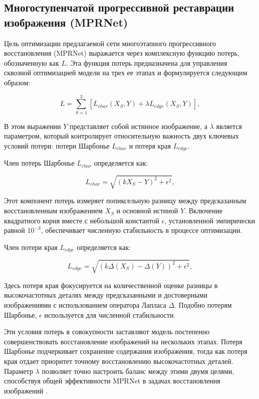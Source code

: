 \subsection{Многоступенчатой прогрессивной реставрации изображения (MPRNet)}

Цель оптимизации предлагаемой сети многоэтапного прогрессивного восстановления (MPRNet) выражается через комплексную функцию потерь, обозначенную как \(L \). Эта функция потерь предназначена для управления сквозной оптимизацией модели на трех ее этапах и формулируется следующим образом:

\begin{equation}
	L = \sum_{S=1}^{3} [L_{char}(X_S, Y) + \lambda L_{edge}(X_S, Y)],
\end{equation}

В этом выражении \( Y \) представляет собой истинное изображение, а \( \lambda \) является параметром, который контролирует относительную важность двух ключевых условий потери: потери Шарбонье \( L_{char} \) и потеря края \( L_{edge} \).

Член потерь Шарбонье \( L_{char} \) определяется как:

\begin{equation}
	L_{char} = \sqrt{(kX_S - Y)^2 + \epsilon^2},
\end{equation}

Этот компонент потерь измеряет попиксельную разницу между предсказанным восстановленным изображением \( X_S \) и основной истиной \( Y \). Включение квадратного корня вместе с небольшой константой \( \epsilon \), установленной эмпирически равной \( 10^{-3} \), обеспечивает численную стабильность в процессе оптимизации.

Член потери края \( L_{edge} \) определяется как:

\begin{equation}
	L_{edge} = \sqrt{(k\Delta(X_S) - \Delta(Y))^2 + \epsilon^2},
\end{equation}

Здесь потеря края фокусируется на количественной оценке разницы в высокочастотных деталях между предсказанными и достоверными изображениями с использованием оператора Лапласа \(\Delta\). Подобно потерям Шарбонье, \( \epsilon \) используется для численной стабильности.

Эти условия потерь в совокупности заставляют модель постепенно совершенствовать восстановление изображений на нескольких этапах. Потеря Шарбонье подчеркивает сохранение содержания изображения, тогда как потеря края отдает приоритет точному восстановлению высокочастотных деталей. Параметр \( \lambda \) позволяет точно настроить баланс между этими двумя целями, способствуя общей эффективности MPRNet в задачах восстановления изображений \cite{zamir2021multi}.

